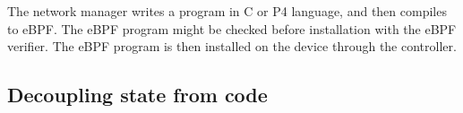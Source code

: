 






The network manager writes a program in C or P4 language, and then compiles to eBPF. The eBPF program might be checked before installation with the eBPF verifier. The eBPF program is then installed on the device through the controller.


\subsection{Decoupling state from code}
\label{sec:selfpopulate}

